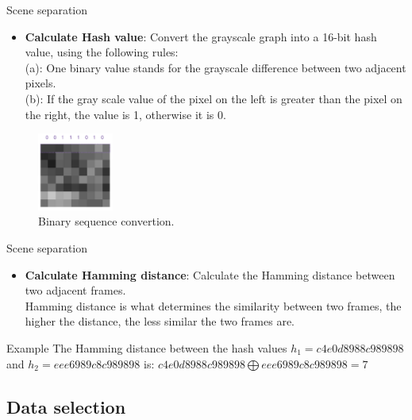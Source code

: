 \documentclass[aspectratio=43,display]{beamer}
\begin{document}
			\begin{frame}{Scene separation}

				\begin{itemize}
					\item \textbf{Calculate Hash value}: Convert the grayscale graph into a 16-bit hash value, using the following rules:\\
					(a): One binary value stands for the grayscale difference between two adjacent pixels.\\
					(b): If the gray scale value of the pixel on the left is greater than the pixel on the right, the value is 1, otherwise it is 0.
				\end{itemize}

				\begin{figure}
					\includegraphics[width=2.5cm]{images/binary-sequence.png}
					\caption{\label{fig:Binary-Sequence}Binary sequence convertion.}
				\end{figure}
				
			\end{frame}

			\begin{frame}{Scene separation}

				\begin{itemize}
					\item \textbf{Calculate Hamming distance}: Calculate the Hamming distance between two adjacent frames.\\
					Hamming distance is what determines the similarity between two frames, the higher the distance, the less similar the two frames are.
				\end{itemize}

				\vskip 0.5cm

				\begin{block}{Example}
					The Hamming distance between the hash values $h_1=c4e0d8988c989898$ and $h_2=eee6989c8c989898$ is:	
					$ c4e0d8988c989898 \bigoplus eee6989c8c989898 = 7 $
				\end{block}
			
			\end{frame}

		\subsection{Data selection}
\end{document}

